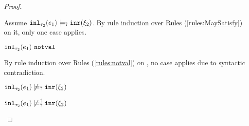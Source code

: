 \begin{proof}
\begin{byCases}
\begin{byCases}
\begin{pfsteps*}
        \end{pfsteps*}
        Assume $\mathtt{inl}_{\tau_2}({e_1}) \models_{?} \mathtt{inr}(\xi_2)$. By rule induction over Rules (\ref{rules:MaySatisfy}) on it, only one case applies.
        \begin{byCases}
        \item[\text{(\ref{rule:CMSNotVal})}]
            \begin{pfsteps*}
            \item $\mathtt{inl}_{\tau_2}({e_1}) ~\mathtt{notval}$  
            \end{pfsteps*}
            By rule induction over Rules (\ref{rules:notval}) on , no case applies due to syntactic contradiction.
        \end{byCases}
        \begin{pfsteps*}
        \item $\mathtt{inl}_{\tau_2}({e_1}) \not\models_{?} \mathtt{inr}(\xi_2)$  
        \item $\mathtt{inl}_{\tau_2}({e_1}) \not\models_{?}^{\dag} \mathtt{inr}(\xi_2)$ 
        \end{pfsteps*}
        

\end{byCases}
\end{byCases}
\end{proof}
